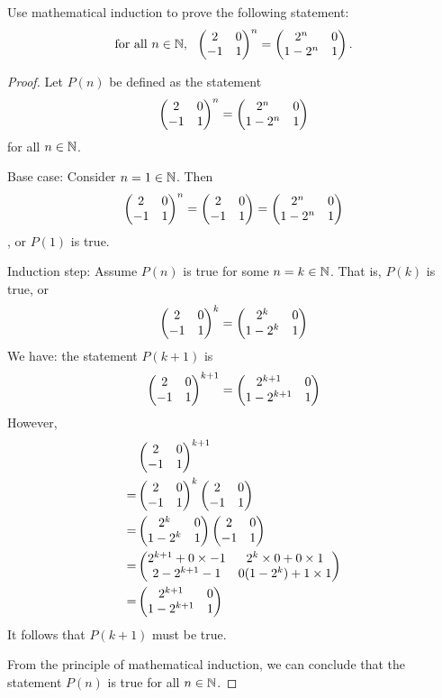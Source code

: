 \begin{question}
	\normalfont
	
	Use mathematical induction to prove the following statement:
	\begin{align*}
		\textnormal{for all}\ n\in\Natural,\ \ 
		\MatTwoTwo{2}{0}{-1}{1}^n
		= \MatTwoTwo{2^n}{0}{1-2^n}{1}.
	\end{align*}
\end{question}

\begin{proof}
    \renewcommand{\qedsymbol}{$\blacksquare$}
    Let $P(n)$ be defined as the statement 
    \[
        \begin{aligned}
            \begin{pmatrix} 2 &0\\ -1 &1 \end{pmatrix}^n=\begin{pmatrix} 2^n &0\\ 1-2^n &1 \end{pmatrix}
        \end{aligned}
    \]
    for all $n\in\mathbb N$. 

    Base case: Consider $n=1\in\mathbb N$. Then 
    \[
        \begin{aligned}
            \begin{pmatrix} 2 &0\\ -1 &1 \end{pmatrix}^n=\begin{pmatrix} 2 &0\\ -1 &1 \end{pmatrix}=\begin{pmatrix} 2^n &0\\ 1-2^n &1 \end{pmatrix}
        \end{aligned}
    \]
    , or $P(1)$ is true.

    Induction step: Assume $P(n)$ is true for some $n=k\in\mathbb N$. That is, $P(k)$ is true, or 
    \[
        \begin{aligned}
            \begin{pmatrix} 2 &0\\ -1 &1 \end{pmatrix}^k=\begin{pmatrix} 2^k &0\\ 1-2^k &1 \end{pmatrix}
        \end{aligned}
    \] 
    We have: the statement $P(k+1)$ is 
    \[
        \begin{aligned}
            \begin{pmatrix} 2 &0\\ -1 &1 \end{pmatrix}^{k+1}=\begin{pmatrix} 2^{k+1} &0\\ 1-2^{k+1} &1 \end{pmatrix}
        \end{aligned}
    \]
    However,
    \[
        \begin{aligned}
            &\begin{pmatrix} 2 &0\\ -1 &1 \end{pmatrix}^{k+1}\\
            =&\begin{pmatrix} 2 &0\\ -1 &1 \end{pmatrix}^k\begin{pmatrix} 2 &0\\ -1 &1 \end{pmatrix}\\
            =&\begin{pmatrix} 2^k &0\\ 1-2^k &1 \end{pmatrix}\begin{pmatrix} 2 &0\\ -1 &1 \end{pmatrix}\\
            =&\begin{pmatrix} 2^{k+1}+0\times-1 &2^k\times 0+0\times 1\\ 2-2^{k+1}-1 &0(1-2^k)+1\times 1 \end{pmatrix}\\
            =&\begin{pmatrix} 2^{k+1} &0\\ 1-2^{k+1} &1 \end{pmatrix}
        \end{aligned}
    \]
    It follows that $P(k+1)$ must be true.

    From the principle of mathematical induction, we can conclude that the statement $P(n)$ is true for all $n\in\mathbb N$.
\end{proof}
